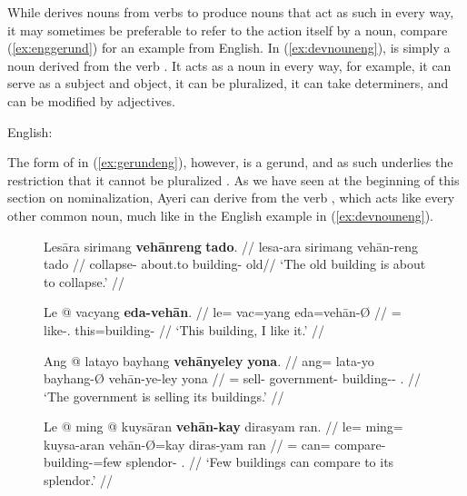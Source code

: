 
While  derives nouns from verbs to produce nouns that act as
such in every way, it may sometimes be preferable to refer to the action itself
by a noun, compare (\ref{ex:enggerund}) for an example from English. In
(\ref{ex:devnouneng}),  is simply a noun derived from the verb
. It acts as a noun in every way, for example, it can serve as a 
subject and object, it can be pluralized, it can take determiners, and can be 
modified by adjectives.

\pex\label{ex:enggerund}%
	English:
	\a\label{ex:devnouneng} 
	\a\label{ex:gerundeng} 
\xe

The form of  in (\ref{ex:gerundeng}), however, is a gerund, and as
such underlies the restriction that it cannot be pluralized
\citep[35]{payne1997}. As we have seen at the beginning of this section on
nominalization, Ayeri can derive 
from the verb , which acts like every other common
noun, much like in the English example in (\ref{ex:devnouneng}).

\begin{figure}
\pex\label{ex:vbnomz}
\a\label{ex:nomz-sbj-adj}\begingl
	\gla Lesāra sirimang \textbf{vehānreng} \textbf{tado}. //
	\glb lesa-ara sirimang vehān-reng tado //
	\glc collapse-\TsgI{} about.to building-\AargI{} old//
	\glft `The old building is about to collapse.' //
\endgl

\a\label{ex:nomz-obj-det}\begingl
	\gla Le @ vacyang \textbf{eda-vehān}. //
	\glb le= vac=yang eda=vehān-Ø //
	\glc \PatTI{}= like-\Fsg{}.\Aarg{} this=building-\Top{} //
	\glft `This building, I like it.' //
\endgl

\a\label{ex:nomz-pl-poss}\begingl
	\gla Ang @ latayo bayhang \textbf{vehānyeley} \textbf{yona}. //
	\glb ang= lata-yo bayhang-Ø vehān-ye-ley yona //
	\glc \AgtT{}= sell-\TsgN{} government-\Top{} 
		building-\Pl{}-\PargI{} \TsgN{}.\Gen{} //
	\glft `The government is selling its buildings.' //
\endgl

\a\label{ex:nomz-qty}\begingl
	\gla Le @ ming @ kuysāran \textbf{vehān-kay} dirasyam ran. //
	\glb le= ming= kuysa-aran vehān-Ø=kay diras-yam ran //
	\glc \PatTI{}= can= compare-\TplI{} building-\Top=few 
		splendor-\Dat{} \TsgI{}.\Gen{} //
	\glft `Few buildings can compare to its splendor.' //
\endgl
\xe
\end{figure}

